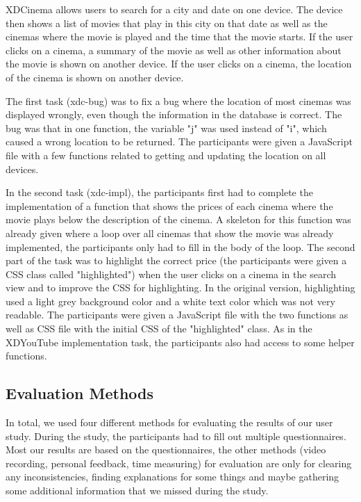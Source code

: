 XDCinema allows users to search for a city and date on one device. The device then shows a list of movies that play in this city on that date as well as the cinemas where the movie is played and the time that the movie starts. If the user clicks on a cinema, a summary of the movie as well as other information about the movie is shown on another device. If the user clicks on a cinema, the location of the cinema is shown on another device.

The first task (xdc-bug) was to fix a bug where the location of most cinemas was displayed wrongly, even though the information in the database is correct. The bug was that in one function, the variable "j" was used instead of "i", which caused a wrong location to be returned. The participants were given a JavaScript file with a few functions related to getting and updating the location on all devices.

In the second task (xdc-impl), the participants first had to complete the implementation of a function that shows the prices of each cinema where the movie plays below the description of the cinema. A skeleton for this function was already given where a loop over all cinemas that show the movie was already implemented, the participants only had to fill in the body of the loop. The second part of the task was to highlight the correct price (the participants were given a CSS class called "highlighted") when the user clicks on a cinema in the search view and to improve the CSS for highlighting. In the original version, highlighting used a light grey background color and a white text color which was not very readable. The participants were given a JavaScript file with the two functions as well as CSS file with the initial CSS of the "highlighted" class. As in the XDYouTube implementation task, the participants also had access to some helper functions.

\subsection{Evaluation Methods}

In total, we used four different methods for evaluating the results of our user study. During the study, the participants had to fill out multiple questionnaires. Most our results are based on the questionnaires, the other methods (video recording, personal feedback, time measuring) for evaluation are only for clearing any inconsistencies, finding explanations for some things and maybe gathering some additional information that we missed during the study.

